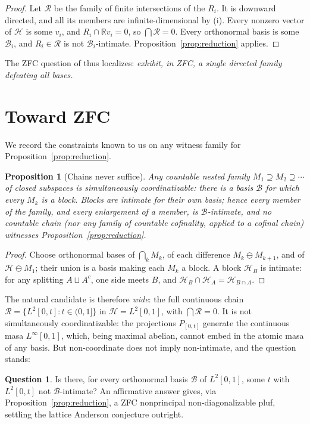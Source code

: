 \documentclass[11pt,reqno]{amsart}
\newtheorem{proposition}[theorem]{Proposition}
\theoremstyle{definition}
\newtheorem{question}[theorem]{Question}
\newcommand{\HH}{\mathcal{H}}
\newcommand{\R}{\mathbb{R}}
\begin{document}
\begin{proof}
Let $\mathcal R$ be the family of finite intersections of the $R_i$. It is downward
directed, and all its members are infinite-dimensional by (i). Every nonzero vector of
$\HH$ is some $v_i$, and $R_i\cap\R v_i=0$, so $\bigcap\mathcal R=0$. Every
orthonormal basis is some $\mathcal B_i$, and $R_i\in\mathcal R$ is not
$\mathcal B_i$-intimate. Proposition~\ref{prop:reduction} applies.
\end{proof}

The ZFC question of \cite{FWI} thus localizes: \emph{exhibit, in ZFC, a single directed
family defeating all bases.}

\section{Toward ZFC}\label{sec:zfc}

We record the constraints known to us on any witness family for
Proposition~\ref{prop:reduction}.

\begin{proposition}[Chains never suffice]\label{prop:chains}
Any countable nested family $M_1\supseteq M_2\supseteq\cdots$ of closed subspaces is
simultaneously coordinatizable: there is a basis $\mathcal B$ for which every $M_k$ is a
block. Blocks are intimate for their own basis; hence every member of the family, and
every enlargement of a member, is $\mathcal B$-intimate, and no countable chain (nor any
family of countable cofinality, applied to a cofinal chain) witnesses
Proposition~\ref{prop:reduction}.
\end{proposition}

\begin{proof}
Choose orthonormal bases of $\bigcap_kM_k$, of each difference $M_k\ominus M_{k+1}$, and
of $\HH\ominus M_1$; their union is a basis making each $M_k$ a block. A block $\HH_B$
is intimate: for any splitting $A\sqcup A^c$, one side meets $B$, and
$\HH_B\cap\HH_A=\HH_{B\cap A}$.
\end{proof}

The natural candidate is therefore \emph{wide}: the full continuous chain
$\mathcal R=\{L^2[0,t]:t\in(0,1]\}$ in $\HH=L^2[0,1]$, with $\bigcap\mathcal R=0$. It is
not simultaneously coordinatizable: the projections $P_{[0,t]}$ generate the continuous
masa $L^\infty[0,1]$, which, being maximal abelian, cannot embed in the atomic masa of
any basis. But non-coordinate does not imply non-intimate, and the question stands:

\begin{question}\label{q:lebesgue}
Is there, for every orthonormal basis $\mathcal B$ of $L^2[0,1]$, some $t$ with
$L^2[0,t]$ not $\mathcal B$-intimate? An affirmative answer gives, via
Proposition~\ref{prop:reduction}, a ZFC nonprincipal non-diagonalizable pluf, settling
the lattice Anderson conjecture outright.
\end{question}
\end{document}
